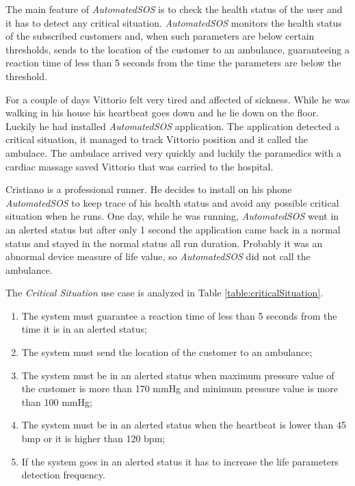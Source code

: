 The main feature of \textit{AutomatedSOS} is to check the health status of the user and it has to detect any critical situation.
\textit{AutomatedSOS} monitors the health status of the subscribed customers and, when such parameters are below certain thresholds, sends to the location of the customer to an ambulance, guaranteeing a reaction time of less than 5 seconds from the time the parameters are below the threshold.

For a couple of days Vittorio felt very tired and affected of sickness. While he was walking in his house his heartbeat goes down and he lie down on the floor. Luckily he had installed \textit{AutomatedSOS} application.
The application detected a critical situation, it managed to track Vittorio position and it called the ambulace.
The ambulace arrived very quickly and luckily the paramedics with a cardiac massage saved Vittorio that was carried to the hospital.

Cristiano is a professional runner. He decides to install on his phone \textit{AutomatedSOS} to keep trace of his health status and avoid any possible critical situation when he runs.
One day, while he was running, \textit{AutomatedSOS} went in an alerted status but after only 1 second the application came back in a normal status and stayed in the normal status all run duration.
Probably it was an abnormal device measure of life value, so \textit{AutomatedSOS} did not call the ambulance.

The \textit{Critical Situation} use case is analyzed in Table \ref{table:criticalSituation}.

\begin{enumerate}
  \item The system must guarantee a reaction time of less than 5 seconds from the time it is in an alerted status;
  \item The system must send the location of the customer to an ambulance;
  \item The system must be in an alerted status when maximum pressure value of the customer is more than 170 mmHg and minimum pressure value is more than 100 mmHg;
  \item The system must be in an alerted status when the heartbeat is lower than 45 bmp or it is higher than 120 bpm;
  \item If the system goes in an alerted status it has to increase the life parameters detection frequency.
\end{enumerate}

